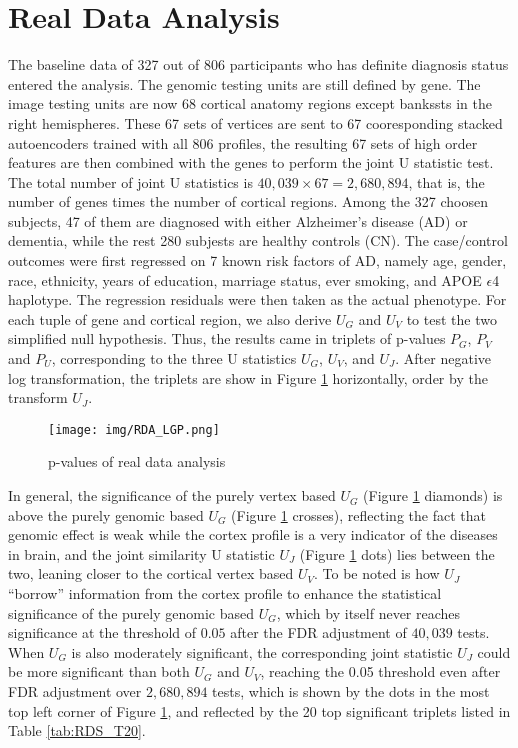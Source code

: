 \section{Real Data Analysis}
The baseline data of 327 out of 806 participants who has definite diagnosis status entered the analysis. The genomic testing units are still defined by gene. The image testing units are now 68 cortical anatomy regions except bankssts in the right hemispheres. These 67 sets of vertices are sent to 67 cooresponding stacked autoencoders trained with all 806 profiles, the resulting 67 sets of high order features are then combined with the genes to perform the joint U statistic test. The total number of joint U statistics is $40,039 \times 67 = 2,680,894$, that is, the number of genes times the number of cortical regions. Among the 327 choosen subjects, 47 of them are diagnosed with either Alzheimer's disease (AD) or dementia, while the rest 280 subjests are healthy controls (CN). The case/control outcomes were first regressed on 7 known risk factors of AD, namely age, gender, race, ethnicity, years of education, marriage status, ever smoking, and APOE $\epsilon$4 haplotype. The regression residuals were then taken as the actual phenotype. For each tuple of gene and cortical region, we also derive $U_G$ and $U_V$ to test the two simplified null hypothesis. Thus, the results came in triplets of p-values $P_G$, $P_V$ and $P_U$, corresponding to the three U statistics $U_G$, $U_V$, and $U_J$. After negative log transformation, the triplets are show in Figure \ref{fig:RDA_PVL} horizontally, order by the transform $U_J$.
\begin{figure}[!htbp]
\centering
\texttt{[image: img/RDA\_LGP.png]}
\caption{p-values of real data analysis}
\label{fig:RDA_PVL}
\end{figure}
In general, the significance of the purely vertex based $U_G$ (Figure \ref{fig:RDA_PVL} diamonds) is above the purely genomic based $U_G$ (Figure \ref{fig:RDA_PVL} crosses), reflecting the fact that genomic effect is weak while the cortex profile is a very indicator of the diseases in brain, and the joint similarity U statistic $U_J$ (Figure \ref{fig:RDA_PVL} dots) lies between the two, leaning closer to the cortical vertex based $U_V$. To be noted is how $U_J$ ``borrow'' information from the cortex profile to enhance the statistical significance of the purely genomic based $U_G$, which by itself never reaches significance at the threshold of $0.05$ after the FDR adjustment of $40,039$ tests. When $U_G$ is also moderately significant, the corresponding joint statistic $U_J$ could be more significant than both $U_G$ and $U_V$, reaching the 0.05 threshold even after FDR adjustment over $2,680,894$ tests, which is shown by the dots in the most top left corner of Figure \ref{fig:RDA_PVL}, and reflected by the 20 top significant triplets listed in Table \ref{tab:RDS_T20}.
